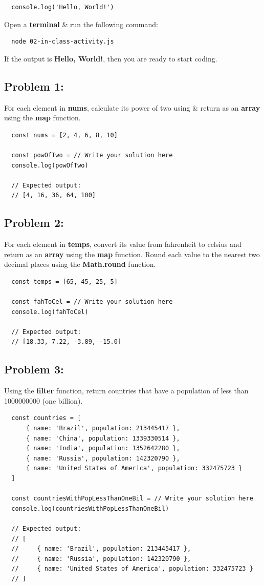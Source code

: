 \documentclass{article}
\begin{document}
\begin{verbatim}
  console.log('Hello, World!')
\end{verbatim}

Open a \textbf{terminal} \& run the following command:

\begin{verbatim}
  node 02-in-class-activity.js
\end{verbatim}

If the output is \textbf{Hello, World!}, then you are ready to start coding.

\subsection*{Problem 1:}
For each element in \textbf{nums}, calculate its power of two using \& return as an \textbf{array} using the \textbf{map} function.

\begin{verbatim}
  const nums = [2, 4, 6, 8, 10]

  const powOfTwo = // Write your solution here
  console.log(powOfTwo)

  // Expected output:
  // [4, 16, 36, 64, 100]
\end{verbatim}

\subsection*{Problem 2:}
For each element in \textbf{temps}, convert its value from fahrenheit to celsius and return as an \textbf{array} using the \textbf{map} function. Round each value to the nearest two decimal places using the \textbf{Math.round} function.

\begin{verbatim}
  const temps = [65, 45, 25, 5]

  const fahToCel = // Write your solution here
  console.log(fahToCel)

  // Expected output:
  // [18.33, 7.22, -3.89, -15.0]
\end{verbatim}

\subsection*{Problem 3:}
Using the \textbf{filter} function, return countries that have a population of less than 1000000000 (one billion).

\begin{verbatim}
  const countries = [
      { name: 'Brazil', population: 213445417 },
      { name: 'China', population: 1339330514 },
      { name: 'India', population: 1352642280 },
      { name: 'Russia', population: 142320790 },
      { name: 'United States of America', population: 332475723 }
  ]

  const countriesWithPopLessThanOneBil = // Write your solution here
  console.log(countriesWithPopLessThanOneBil)

  // Expected output:
  // [
  //     { name: 'Brazil', population: 213445417 }, 
  //     { name: 'Russia', population: 142320790 }, 
  //     { name: 'United States of America', population: 332475723 }
  // ]
\end{verbatim}
\end{document}
